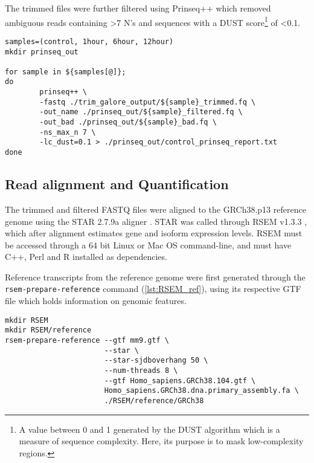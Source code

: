The trimmed files were further filtered using Prinseq++ \citep{prinseq++} which removed ambiguous reads containing >7 N's and sequences with a DUST score\footnote{A value between 0 and 1 generated by the DUST algorithm which is a measure of sequence complexity. Here, its purpose is to mask low-complexity regions.} of <0.1.

\begin{lstlisting}[caption=Prinseq++ filtering]
samples=(control, 1hour, 6hour, 12hour)
mkdir prinseq_out

for sample in ${samples[@]};
do
        prinseq++ \
        -fastq ./trim_galore_output/${sample}_trimmed.fq \
        -out_name ./prinseq_out/${sample}_filtered.fq \
        -out_bad ./prinseq_out/${sample}_bad.fq \
        -ns_max_n 7 \
        -lc_dust=0.1 > ./prinseq_out/control_prinseq_report.txt
done
\end{lstlisting}

\subsection{Read alignment and Quantification}
The trimmed and filtered FASTQ files were aligned to the GRCh38.p13 reference genome \citep{ref} using the \ac{STAR} 2.7.9a aligner \citep{Dobin2013}. \ac{STAR} was called through RSEM v1.3.3 \citep{li2011rsem}, which after alignment estimates gene and isoform expression levels. RSEM must be accessed through a 64 bit Linux or Mac OS command-line, and must have C++, Perl and R installed as dependencies.

Reference transcripts from the reference genome were first generated through the \texttt{rsem-prepare-reference} command (\autoref{lst:RSEM_ref}), using its respective GTF file which holds information on genomic features. 


\begin{lstlisting}[caption= reference generation, label={lst:RSEM_ref}]
mkdir RSEM
mkdir RSEM/reference
rsem-prepare-reference --gtf mm9.gtf \
                       --star \
                       --star-sjdboverhang 50 \
                       --num-threads 8 \
                       --gtf Homo_sapiens.GRCh38.104.gtf \
                       Homo_sapiens.GRCh38.dna.primary_assembly.fa \
                       ./RSEM/reference/GRCh38
\end{lstlisting}

